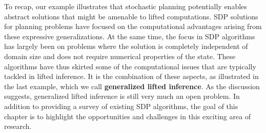 To recap, our example illustrates that stochastic planning potentially enables abstract solutions that 
might be amenable to lifted computations. 
SDP solutions for planning problems have
focused on the computational advantages arising from these
expressive generalizations. At the same time, the focus in SDP algorithms has largely been on
problems where the solution is completely independent of domain size and does not require numerical properties of the state. 
These algorithms have thus skirted some of
the computational issues that are typically tackled in lifted inference. It is the
combination of these aspects, as illustrated in the last example, which we call {\bf generalized lifted
inference}. As the discussion suggests, generalized lifted inference is still very much an open problem. In addition to providing a survey of existing SDP algorithms, the goal of this chapter is to highlight the opportunities and challenges in this exciting area of research.

%
%

